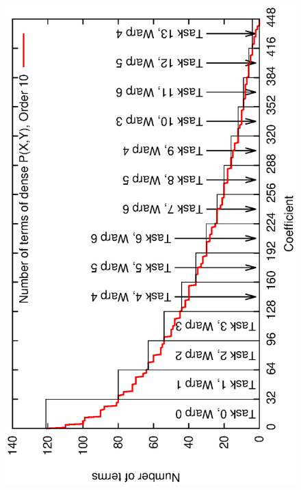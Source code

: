 \documentclass[oribibl,a4paper]{llncs2e/llncs}
\begin{document}
\begin{itemize}
\begin{figure}[t]
{        \includegraphics[scale=0.37, angle=-90]{coeffs.eps} 
}
\end{figure}
\end{itemize}
\end{document}
